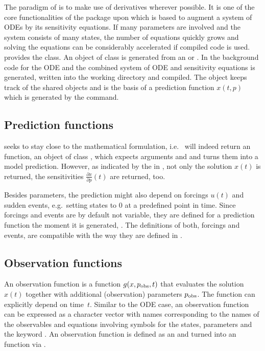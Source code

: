 \documentclass[article]{jss}
\begin{document}
The paradigm of  is to make use of derivatives wherever possible. It is one of the core functionalities of the  package upon which  is based to augment a system of ODEs by its sensitivity equations. If many parameters are involved and the system consists of many states, the number of equations quickly grows and solving the equations can be considerably accelerated if compiled code is used.  provides the  class. An object of class  is generated from an  or . In the background  code for the ODE and the combined system of ODE and sensitivity equations is generated, written into the working directory and compiled. The  object keeps track of the shared objects and is the basis of a prediction function $x(t, p)$ which is generated by the  command.

\subsection{Prediction functions}

 seeks to stay close to the mathematical formulation, i.e.~ will indeed return an  function, an object of class , which expects arguments  and  and turns them into a model prediction. However, as indicated by the  in , not only the solution $x(t)$ is returned, the sensitivities $\frac{\partial x}{\partial p}(t)$ are returned, too. 

Besides parameters, the prediction might also depend on forcings $u(t)$ and sudden events, e.g.~setting states to 0 at a predefined point in time. Since forcings and events are by default not variable, they are defined for a prediction function the moment it is generated, . The definitions of both, forcings and events, are compatible with the way they are defined in .

\subsection{Observation functions}


An observation function is a function $g(x, p_{\rm obs}, t)$ that evaluates the solution $x(t)$ together with additional (observation) parameters $p_{\rm obs}$. The function can explicitly depend on time~$t$. Similar to the ODE case, an observation function can be expressed as a character vector with names corresponding to the names of the observables and equations involving symbols for the states, parameters and the keyword . An observation function is defined as an  and turned into an  function via .
\end{document}
